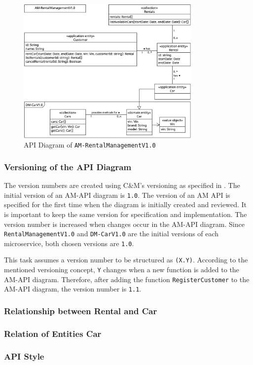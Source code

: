 \begin{figure}
    \centering
    \includegraphics[width=0.8\textwidth]{figures/microservices/rentalManagement/ms_rentalManagement_apiDiagram.png}
    \caption{API Diagram of \texttt{AM-RentalManagementV1.0}}
    \label{fig:ad_am-rental_management_v1.0}
\end{figure}

\subsubsection*{Versioning of the API Diagram}
The version numbers are created using C\&M's versioning as specified in \cite{CM-G-Ver}.
The initial version of an AM-API diagram is \texttt{1.0}.
The version of an AM API is specified for the first time when the diagram is initially created and reviewed.
It is important to keep the same version for specification and implementation.
The version number is increased when changes occur in the AM-API diagram.
Since \texttt{RentalManagementV1.0} and \texttt{DM-CarV1.0} are the initial versions of each microservice, both chosen versions are \texttt{1.0}.

This task assumes a version number to be structured as \texttt{(X.Y)}.
According to the mentioned versioning concept, \texttt{Y} changes when a new function is added to the AM-API diagram.
Therefore, after adding the function \texttt{RegisterCustomer} to the AM-API diagram, the version number is \texttt{1.1}.

\subsubsection*{Relationship between Rental and Car}

\subsubsection*{Relation of Entities Car}

\subsubsection*{API Style}